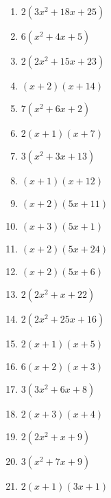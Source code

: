 \documentclass[9pt,dvipdfmx,a4paper]{article}
\begin{document}
\begin{multicols}{2}
\begin{enumerate}
\item
$ 2 \left(3 x^{2} + 18 x + 25\right)$

\item
$ 6 \left(x^{2} + 4 x + 5\right)$

\item
$ 2 \left(2 x^{2} + 15 x + 23\right)$

\item
$ \left(x + 2\right) \left(x + 14\right)$

\item
$ 7 \left(x^{2} + 6 x + 2\right)$

\item
$ 2 \left(x + 1\right) \left(x + 7\right)$

\item
$ 3 \left(x^{2} + 3 x + 13\right)$

\item
$ \left(x + 1\right) \left(x + 12\right)$

\item
$ \left(x + 2\right) \left(5 x + 11\right)$

\item
$ \left(x + 3\right) \left(5 x + 1\right)$

\item
$ \left(x + 2\right) \left(5 x + 24\right)$

\item
$ \left(x + 2\right) \left(5 x + 6\right)$

\item
$ 2 \left(2 x^{2} + x + 22\right)$

\item
$ 2 \left(2 x^{2} + 25 x + 16\right)$

\item
$ 2 \left(x + 1\right) \left(x + 5\right)$

\item
$ 6 \left(x + 2\right) \left(x + 3\right)$

\item
$ 3 \left(3 x^{2} + 6 x + 8\right)$

\item
$ 2 \left(x + 3\right) \left(x + 4\right)$

\item
$ 2 \left(2 x^{2} + x + 9\right)$

\item
$ 3 \left(x^{2} + 7 x + 9\right)$

\item
$ 2 \left(x + 1\right) \left(3 x + 1\right)$


\end{enumerate}
\end{multicols}
\end{document}

